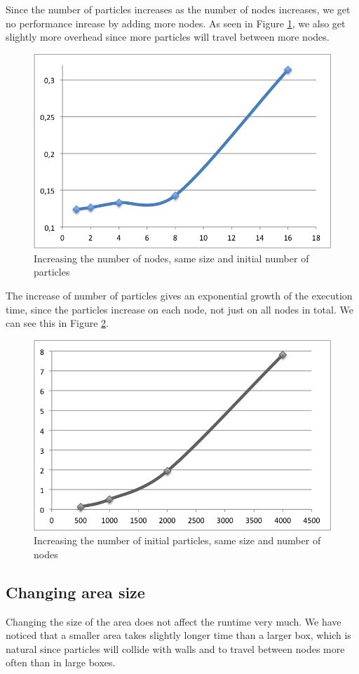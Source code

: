 \documentclass[a4paper]{article}
\begin{document}
Since the number of particles increases as the number of nodes
increases, we get no performance inrease by adding more nodes. As seen
in Figure \ref{fig1}, we also get slightly more overhead since more
particles will travel between more nodes.

\begin{figure}
  \centering
  \includegraphics{processor_scale.png}
  \caption{Increasing the number of nodes, same size and initial number of particles}
  \label{fig1}
\end{figure}

The increase of number of particles gives an exponential growth of the
execution time, since the particles increase on each node, not just on
all nodes in total. We can see this in Figure \ref{fig2}.

\begin{figure}
  \centering
  \includegraphics{particles_scale.png}
  \caption{Increasing the number of initial particles, same size and number of nodes}
  \label{fig2}
\end{figure}

\subsection{Changing area size}

Changing the size of the area does not affect the runtime very much. We
have noticed that a smaller area takes slightly longer time than a
larger box, which is natural since particles will collide with walls and
to travel between nodes more often than in large boxes.
\end{document}
